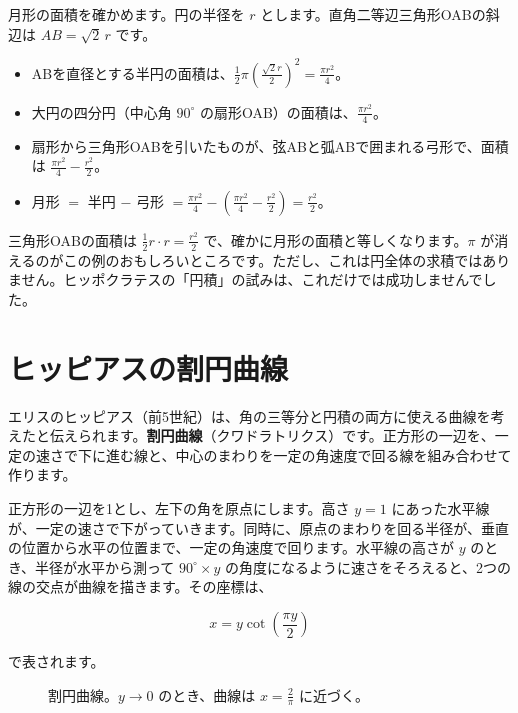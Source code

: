 \documentclass[a4paper,11pt,openany]{ltjsbook}
\begin{document}
月形の面積を確かめます。円の半径を $r$ とします。直角二等辺三角形OABの斜辺は $AB=\sqrt2\,r$ です。

\begin{itemize}[leftmargin=*]
\item ABを直径とする半円の面積は、$\tfrac12\pi\left(\tfrac{\sqrt2 r}{2}\right)^2=\tfrac{\pi r^2}{4}$。
\item 大円の四分円（中心角 $90^\circ$ の扇形OAB）の面積は、$\tfrac{\pi r^2}{4}$。
\item 扇形から三角形OABを引いたものが、弦ABと弧ABで囲まれる弓形で、面積は $\tfrac{\pi r^2}{4}-\tfrac{r^2}{2}$。
\item 月形 $=$ 半円 $-$ 弓形 $=\tfrac{\pi r^2}{4}-\left(\tfrac{\pi r^2}{4}-\tfrac{r^2}{2}\right)=\tfrac{r^2}{2}$。
\end{itemize}

三角形OABの面積は $\tfrac12 r\cdot r=\tfrac{r^2}{2}$ で、確かに月形の面積と等しくなります。$\pi$ が消えるのがこの例のおもしろいところです。ただし、これは円全体の求積ではありません。ヒッポクラテスの「円積」の試みは、これだけでは成功しませんでした。

\section{ヒッピアスの割円曲線}

エリスのヒッピアス（前5世紀）は、角の三等分と円積の両方に使える曲線を考えたと伝えられます。\textbf{割円曲線}（クワドラトリクス）です。正方形の一辺を、一定の速さで下に進む線と、中心のまわりを一定の角速度で回る線を組み合わせて作ります。

正方形の一辺を1とし、左下の角を原点にします。高さ $y=1$ にあった水平線が、一定の速さで下がっていきます。同時に、原点のまわりを回る半径が、垂直の位置から水平の位置まで、一定の角速度で回ります。水平線の高さが $y$ のとき、半径が水平から測って $90^\circ\times y$ の角度になるように速さをそろえると、2つの線の交点が曲線を描きます。その座標は、

\[
x=y\cot\left(\frac{\pi y}{2}\right)
\]

で表されます。

\begin{figure}[htbp]
\centering
{}
\caption{割円曲線。$y\to0$ のとき、曲線は $x=\tfrac2\pi$ に近づく。}
\end{figure}
\end{document}
